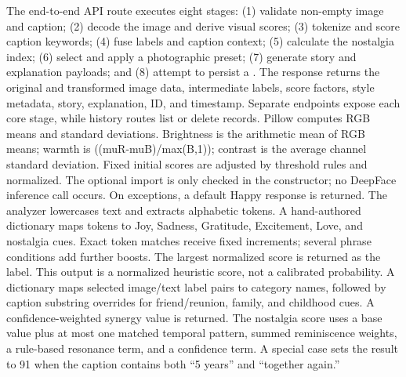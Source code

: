 \documentclass[conference]{IEEEtran}
\begin{document}
{}
\markdownRendererSectionEnd \markdownRendererSectionBegin
{}\markdownRendererInterblockSeparator
{}The end-to-end API route  executes eight stages: (1) validate non-empty image and caption; (2) decode the image and derive visual scores; (3) tokenize and score caption keywords; (4) fuse labels and caption context; (5) calculate the nostalgia index; (6) select and apply a photographic preset; (7) generate story and explanation payloads; and (8) attempt to persist a . The response returns the original and transformed image data, intermediate labels, score factors, style metadata, story, explanation, ID, and timestamp. Separate endpoints expose each core stage, while history routes list or delete records.\markdownRendererInterblockSeparator
{}
\markdownRendererSectionEnd \markdownRendererSectionBegin
{}\markdownRendererInterblockSeparator
{} Pillow computes RGB means and standard deviations. Brightness is the arithmetic mean of RGB means; warmth is ((\markdownRendererBackslash{}mu\markdownRendererUnderscore{}R-\markdownRendererBackslash{}mu\markdownRendererUnderscore{}B)/\markdownRendererBackslash{}max(B,1)); contrast is the average channel standard deviation. Fixed initial scores are adjusted by threshold rules and normalized. The optional  import is only checked in the constructor; no DeepFace inference call occurs. On exceptions, a default Happy response is returned.\markdownRendererParagraphSeparator
{} The analyzer lowercases text and extracts alphabetic tokens. A hand-authored dictionary maps tokens to Joy, Sadness, Gratitude, Excitement, Love, and nostalgia cues. Exact token matches receive fixed increments; several phrase conditions add further boosts. The largest normalized score is returned as the label. This output is a normalized heuristic score, not a calibrated probability.\markdownRendererParagraphSeparator
{} A dictionary maps selected image/text label pairs to category names, followed by caption substring overrides for friend/reunion, family, and childhood cues. A confidence-weighted synergy value is returned. The nostalgia score uses a base value plus at most one matched temporal pattern, summed reminiscence weights, a rule-based resonance term, and a confidence term. A special case sets the result to 91 when the caption contains both “5 years” and “together again.”\markdownRendererParagraphSeparator
\end{document}
